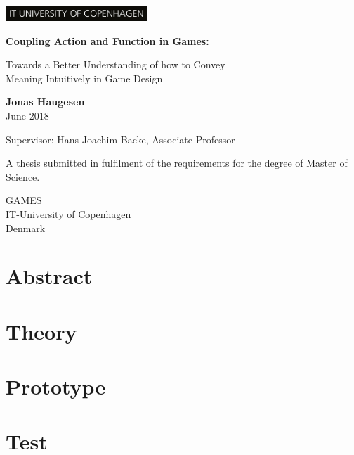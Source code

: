 \documentclass[a4paper]{report}
\begin{document}
\begin{titlepage}

  \begin{flushright}
    \includegraphics[width=0.4\textwidth]{figures/ITU_logo}
  \end{flushright}

  \begin{center}

          \vspace*{1cm}

          \Huge\textbf{Coupling Action and Function in Games:}

          \vspace{0.5cm}
          \Large Towards a Better Understanding of how to Convey \\
            Meaning Intuitively in Game Design

          \vspace{1.5cm}

          \large
          \textbf{Jonas Haugesen} \\
          \vspace{0.4cm}
          June 2018
          \vfill

          Supervisor: Hans-Joachim Backe, Associate Professor\\

          \vspace{0.4cm}

          A thesis submitted in fulfilment of the requirements
          for the degree of Master of Science.

          \vspace{0.8cm}

          GAMES\\
          IT-University of Copenhagen\\
          Denmark\\
          \vspace{2cm}

      \end{center}
\end{titlepage}

\chapter*{Abstract}


\chapter{Theory}

\chapter{Prototype}

\chapter{Test}


\newpage


\appendix

\end{document}
